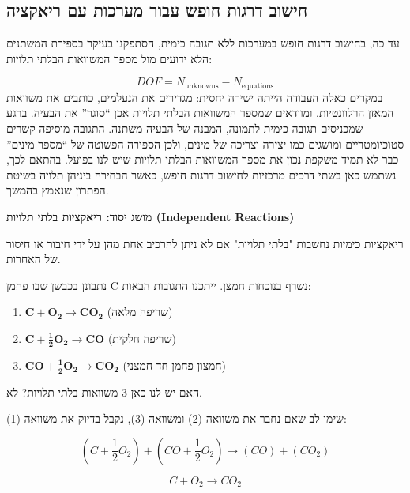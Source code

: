 \documentclass[
  hebrew,
  letterpaper,
  DIV=11,
  numbers=noendperiod]{scrreprt}
\begin{document}
\subsection{חישוב דרגות חופש עבור מערכות עם
ריאקציה}\label{ux5d7ux5d9ux5e9ux5d5ux5d1-ux5d3ux5e8ux5d2ux5d5ux5ea-ux5d7ux5d5ux5e4ux5e9-ux5e2ux5d1ux5d5ux5e8-ux5deux5e2ux5e8ux5dbux5d5ux5ea-ux5e2ux5dd-ux5e8ux5d9ux5d0ux5e7ux5e6ux5d9ux5d4}

עד כה, בחישוב דרגות חופש במערכות ללא תגובה כימית, הסתפקנו בעיקר בספירת
המשתנים הלא ידועים מול מספר המשוואות הבלתי תלויות:

\[DOF = N_{\text{unknowns}} - N_{\text{equations}}\] במקרים כאלה העבודה
הייתה ישירה יחסית: מגדירים את הנעלמים, כותבים את משוואות המאזן
הרלוונטיות, ומוודאים שמספר המשוואות הבלתי תלויות אכן ``סוגר'' את הבעיה.
ברגע שמכניסים תגובה כימית לתמונה, המבנה של הבעיה משתנה. התגובה מוסיפה
קשרים סטוכיומטריים ומושגים כמו יצירה וצריכה של מינים, ולכן הספירה הפשוטה
של ``מספר מינים'' כבר לא תמיד משקפת נכון את מספר המשוואות הבלתי תלויות
שיש לנו בפועל. בהתאם לכך, נשתמש כאן בשתי דרכים מרכזיות לחישוב דרגות
חופש, כאשר הבחירה ביניהן תלויה בשיטת הפתרון שנאמץ בהמשך.

\textbf{מושג יסוד: ריאקציות בלתי תלויות (Independent Reactions)}

ריאקציות כימיות נחשבות "בלתי תלויות" אם לא ניתן להרכיב אחת מהן על ידי
חיבור או חיסור של האחרות.

נתבונן בכבשן שבו פחמן C נשרף בנוכחות חמצן. ייתכנו התגובות הבאות:

\begin{enumerate}
\def\labelenumi{\arabic{enumi}.}
\item
  \(\mathbf{C +}\mathbf{O}_{\mathbf{2}}\mathbf{\rightarrow}\mathbf{C}\mathbf{O}_{\mathbf{2}}\)
  (שריפה מלאה)
\item
  \(\mathbf{C +}\frac{\mathbf{1}}{\mathbf{2}}\mathbf{O}_{\mathbf{2}}\mathbf{\rightarrow}\mathbf{CO}\)
  (שריפה חלקית)
\item
  \(\mathbf{CO +}\frac{\mathbf{1}}{\mathbf{2}}\mathbf{O}_{\mathbf{2}}\mathbf{\rightarrow}\mathbf{C}\mathbf{O}_{\mathbf{2}}\)
  (חמצון פחמן חד חמצני)
\end{enumerate}

האם יש לנו כאן 3 משוואות בלתי תלויות? לא.

שימו לב שאם נחבר את משוואה (2) ומשוואה (3), נקבל בדיוק את משוואה (1):

\[\left( C + \frac{1}{2}O_{2} \right) + \left( CO + \frac{1}{2}O_{2} \right) \rightarrow (CO) + \left( CO_{2} \right)\]

\[C + O_{2} \rightarrow CO_{2}\]
\end{document}
